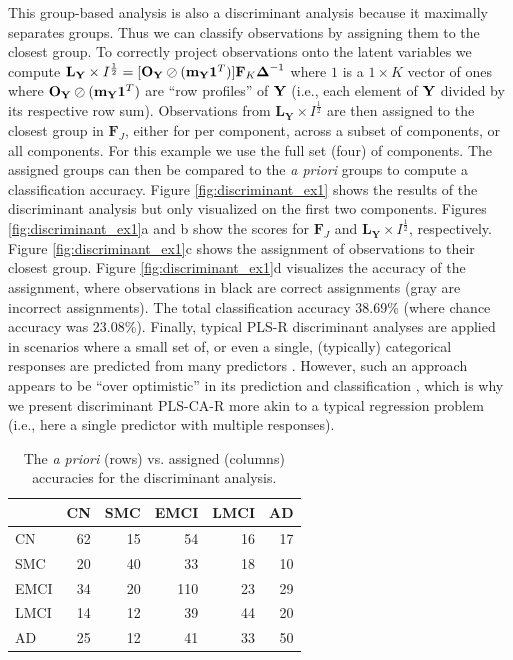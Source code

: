 \documentclass[12pt]{article}
\begin{document}
This group-based analysis is also a discriminant analysis because it
maximally separates groups. Thus we can classify observations by
assigning them to the closest group. To correctly project observations
onto the latent variables we compute
\({\mathbf L}_{\mathbf Y} \times I^{\frac{1}{2}} = [{\bf O}_{\bf Y} \oslash ({\bf m}_{\bf Y}{\bf 1}^T)]{\bf F}_{K}\boldsymbol{\Delta}^{-1}\)
where \(1\) is a \(1 \times K\) vector of ones where
\({\bf O}_{\bf Y} \oslash ({\bf m}_{\bf Y}{\bf 1}^T)\) are ``row
profiles'' of \({\bf Y}\) (i.e., each element of \({\bf Y}\) divided by
its respective row sum). Observations from
\({\mathbf L}_{\mathbf Y} \times I^{\frac{1}{2}}\) are then assigned to
the closest group in \({\mathbf F}_{J}\), either for per component,
across a subset of components, or all components. For this example we
use the full set (four) of components. The assigned groups can then be
compared to the \emph{a priori} groups to compute a classification
accuracy. Figure \ref{fig:discriminant_ex1} shows the results of the
discriminant analysis but only visualized on the first two components.
Figures \ref{fig:discriminant_ex1}a and b show the scores for
\({\mathbf F}_{J}\) and
\({\mathbf L}_{\mathbf Y} \times I^{\frac{1}{2}}\), respectively. Figure
\ref{fig:discriminant_ex1}c shows the assignment of observations to
their closest group. Figure \ref{fig:discriminant_ex1}d visualizes the
accuracy of the assignment, where observations in black are correct
assignments (gray are incorrect assignments). The total classification
accuracy 38.69\% (where chance accuracy was 23.08\%). Finally, typical
PLS-R discriminant analyses are applied in scenarios where a small set
of, or even a single, (typically) categorical responses are predicted
from many predictors \citep{perez-enciso_prediction_2003}. However, such
an approach appears to be ``over optimistic'' in its prediction and
classification \citep{rodriguez-perez_overoptimism_2018}, which is why
we present discriminant PLS-CA-R more akin to a typical regression
problem (i.e., here a single predictor with multiple responses).

\begin{table}[!h]

\caption{\label{tab:unnamed-chunk-7}\label{table:assign_ex1} The \textit{a priori} (rows) vs. assigned (columns) accuracies for the discriminant analysis.}
\centering
\begin{tabular}[t]{lrrrrr}
\toprule
  & CN & SMC & EMCI & LMCI & AD\\
\midrule
CN & 62 & 15 & 54 & 16 & 17\\
SMC & 20 & 40 & 33 & 18 & 10\\
EMCI & 34 & 20 & 110 & 23 & 29\\
LMCI & 14 & 12 & 39 & 44 & 20\\
AD & 25 & 12 & 41 & 33 & 50\\
\bottomrule
\end{tabular}
\end{table}
\end{document}
